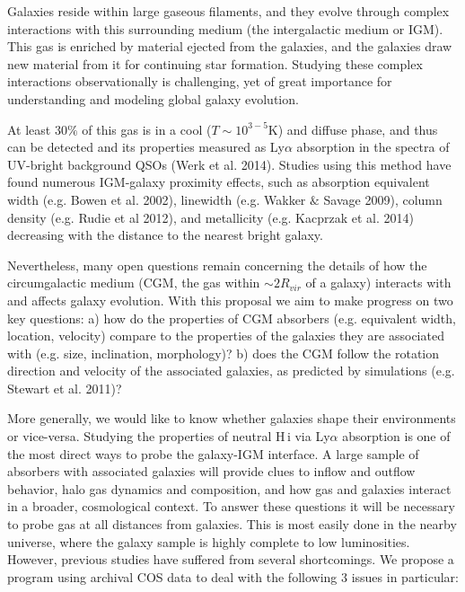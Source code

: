 \documentclass[12pt]{article}
\begin{document}
\indent \indent Galaxies reside within large gaseous filaments, and they evolve through complex interactions with this surrounding medium (the intergalactic medium or IGM). This gas is enriched by material ejected from the galaxies, and the galaxies draw new material from it for continuing star formation. Studying these complex interactions observationally is challenging, yet of great importance for understanding and modeling global galaxy evolution.


At least $30\%$ of this gas is in a cool ($T \sim 10^{3-5}$K) and diffuse phase, and thus can be detected and its properties measured as Ly$\alpha$ absorption in the spectra of UV-bright background QSOs (Werk et al. 2014). Studies using this method have found numerous IGM-galaxy proximity effects, such as absorption equivalent width (e.g. Bowen et al. 2002), linewidth (e.g. Wakker $\&$ Savage 2009), column density (e.g. Rudie et al 2012), and metallicity (e.g. Kacprzak et al. 2014) decreasing with the distance to the nearest bright galaxy. 


Nevertheless, many open questions remain concerning the details of how the circumgalactic medium (CGM, the gas within $\sim 2R_{vir}$ of a galaxy) interacts with and affects galaxy evolution. With this proposal we aim to make progress on two key questions:
a) how do the properties of CGM absorbers (e.g. equivalent width, location, velocity) compare to the properties of the galaxies they are associated with (e.g. size, inclination, morphology)?
b) does the CGM follow the rotation direction and velocity of the associated galaxies, as predicted by simulations (e.g. Stewart et al. 2011)?

More generally, we would like to know whether galaxies shape their environments or vice-versa. Studying the properties of neutral H\,{\sc i} via Ly$\alpha$ absorption is one of the most direct ways to probe the galaxy-IGM interface. A large sample of absorbers with associated galaxies will provide clues to inflow and outflow behavior, halo gas dynamics and composition, and how gas and galaxies interact in a broader, cosmological context. To answer these questions it will be necessary to probe gas at all distances from galaxies. This is most easily done in the nearby universe, where the galaxy sample is highly complete to low luminosities. However, previous studies have suffered from several shortcomings. We propose a program using archival COS data to deal with the following 3 issues in particular:\\
\end{document}
